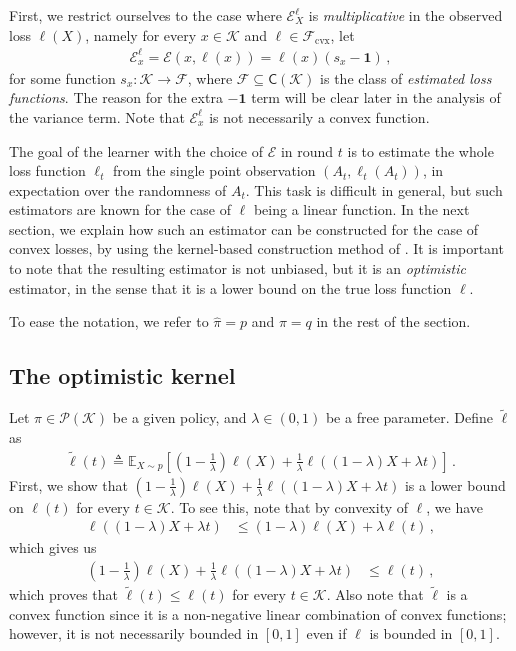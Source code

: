 \documentclass{article}
\theoremstyle{plain}
\theoremstyle{definition}
\theoremstyle{plain}
\newcommand{\E}{\mathbb E}
\newcommand{\K}{\mathcal K}
\newcommand{\cE}{\mathcal E}
\newcommand{\cF}{\mathcal F}
\newcommand{\cP}{\mathcal P}
\begin{document}
First, we restrict ourselves to the case where $\cE_X^\ell$ is \textit{multiplicative} in the observed loss $\ell(X)$, namely for every $x\in\K$ and $\ell\in\cF_{\mathrm{cvx}}$, let
\begin{align}
    \cE_x^\ell = \cE(x,\ell(x)) = \ell(x) (s_x - \mathbf{1})\,,
\end{align}
for some function $s_x:\K\to\cF$, where $\cF\subseteq\mathsf{C}(\K)$ is the class of \textit{estimated loss functions}.
The reason for the extra $- \mathbf{1}$ term will be clear later in the analysis of the variance term.
Note that $\cE_x^\ell$ is not necessarily a convex function.

The goal of the learner with the choice of $\cE$ in round $t$ is to estimate the whole loss function $\ell_t$ from the single point observation $(A_t, \ell_t(A_t))$, in expectation over the randomness of $A_t$.
This task is difficult in general, but such estimators are known for the case of $\ell$ being a linear function.
In the next section, we explain how such an estimator can be constructed for the case of convex losses, by using the kernel-based construction method of \cite{bubeck2016kernelbasedmethodsbanditconvex}.
It is important to note that the resulting estimator is not unbiased, but it is an \textit{optimistic} estimator, in the sense that it is a lower bound on the true loss function $\ell$.

To ease the notation, we refer to $\hat{\pi} = p$ and $\pi = q$ in the rest of the section.

\subsection{The optimistic kernel}
Let $\pi \in \cP(\K)$ be a given policy, and $\lambda \in (0,1)$ be a free parameter.
Define $\tilde{\ell}$ as
\begin{align}
    \tilde{\ell}(t) \triangleq \E_{X\sim p}\left[
        \left(1 - \frac{1}{\lambda}\right)\ell(X) + \frac{1}{\lambda} \ell\left((1-\lambda) X + \lambda t\right)
        \right]\,.
\end{align}
First, we show that $\left(1 - \frac{1}{\lambda}\right)\ell(X) + \frac{1}{\lambda} \ell\left((1-\lambda) X + \lambda t\right)$ is a lower bound on $\ell(t)$ for every $t\in\K$.
To see this, note that by convexity of $\ell$, we have
\begin{align}
    \ell((1-\lambda) X + \lambda t)
     & \leq
    (1-\lambda) \ell(X) + \lambda \ell(t)\,,
\end{align}
which gives us
\begin{align}
    \left( 1 - \frac{1}{\lambda}\right)\ell(X) + \frac{1}{\lambda} \ell\left((1-\lambda) X + \lambda t\right)
     & \leq
    \ell(t)\,,
\end{align}
which proves that $\tilde{\ell}(t) \leq \ell(t)$ for every $t\in\K$.
Also note that $\tilde{\ell}$ is a convex function since it is a non-negative linear combination of convex functions;
however, it is not necessarily bounded in $[0,1]$ even if $\ell$ is bounded in $[0,1]$.
\end{document}
